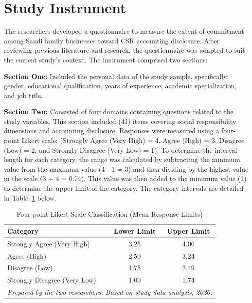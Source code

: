 \documentclass[10pt]{NSP1}
\begin{document}
\section{Study Instrument}

The researchers developed a questionnaire to measure the extent of commitment among Saudi family businesses toward CSR accounting disclosure. After reviewing previous literature and research, the questionnaire was adapted to suit the current study's context. The instrument comprised two sections:

\textbf{Section One:} Included the personal data of the study sample, specifically: gender, educational qualification, years of experience, academic specialization, and job title.

\textbf{Section Two:} Consisted of four domains containing questions related to the study variables. This section included (41) items covering social responsibility dimensions and accounting disclosure. Responses were measured using a four-point Likert scale: (Strongly Agree (Very High) = 4, Agree (High) = 3, Disagree (Low) = 2, and Strongly Disagree (Very Low) = 1). To determine the interval length for each category, the range was calculated by subtracting the minimum value from the maximum value (4 - 1 = 3) and then dividing by the highest value in the scale (3 ÷ 4 = 0.74). This value was then added to the minimum value (1) to determine the upper limit of the category. The category intervals are detailed in Table~\ref{tab:likert} below.

\begin{table}[H]
\centering
\caption{Four-point Likert Scale Classification (Mean Response Limits)}
\label{tab:likert}
\vspace{5pt}
\small
\begin{tabular}{lcc}
\hline
\textbf{Category} & \textbf{Lower Limit} & \textbf{Upper Limit} \\
\hline
Strongly Agree (Very High) & 3.25 & 4.00 \\
Agree (High) & 2.50 & 3.24 \\
Disagree (Low) & 1.75 & 2.49 \\
Strongly Disagree (Very Low) & 1.00 & 1.74 \\
\hline
\multicolumn{3}{l}{\footnotesize \textit{Prepared by the two researchers: Based on study data analysis, 2026.}} \\
\end{tabular}
\end{table}
\end{document}
